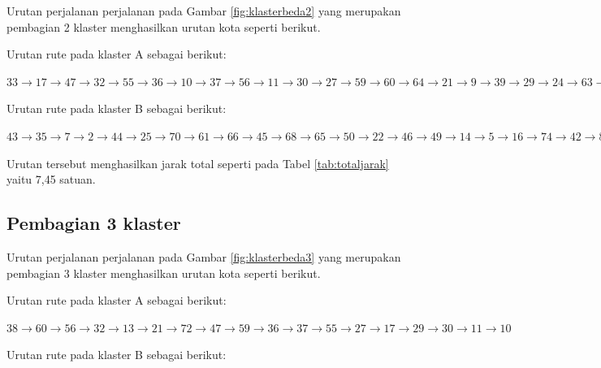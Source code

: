 Urutan perjalanan perjalanan pada Gambar \ref{fig:klasterbeda2} yang merupakan pembagian 2 klaster menghasilkan urutan kota seperti berikut.

\noindent Urutan rute pada klaster A sebagai berikut:

\noindent $
33 \rightarrow 17 \rightarrow 47 \rightarrow 32 \rightarrow 55 \rightarrow 36 \rightarrow 10 \rightarrow 37 \rightarrow 56 \rightarrow 11 \rightarrow 30 \rightarrow 27 \rightarrow 59 \rightarrow 60 \rightarrow 64 \rightarrow 21 \rightarrow 9 \rightarrow 39 \rightarrow 29 \rightarrow 24 \rightarrow 63 \rightarrow 72 \rightarrow 13 \rightarrow 6 \rightarrow 38 \rightarrow 52
$

\noindent Urutan rute pada klaster B sebagai berikut:

\noindent $
43 \rightarrow 35 \rightarrow 7 \rightarrow 2 \rightarrow 44 \rightarrow 25 \rightarrow 70 \rightarrow 61 \rightarrow 66 \rightarrow 45 \rightarrow 68 \rightarrow 65 \rightarrow 50 \rightarrow 22 \rightarrow 46 \rightarrow 49 \rightarrow 14 \rightarrow 5 \rightarrow 16 \rightarrow 74 \rightarrow 42 \rightarrow 8 \rightarrow 48 \rightarrow 31 \rightarrow 26 \rightarrow 18 \rightarrow 54 \rightarrow 40 \rightarrow 58 \rightarrow 67 \rightarrow 15 \rightarrow 12 \rightarrow 57 \rightarrow 20 \rightarrow 34 \rightarrow 69 \rightarrow 75 \rightarrow 41 \rightarrow 23 \rightarrow 51 \rightarrow 19 \rightarrow 28 \rightarrow 1 \rightarrow 62 \rightarrow 4 \rightarrow 53 \rightarrow 3 \rightarrow 71 \rightarrow 73
$

Urutan tersebut menghasilkan jarak total seperti pada Tabel \ref{tab:totaljarak} yaitu 7,45 satuan.

\subsection{Pembagian 3 klaster}

Urutan perjalanan perjalanan pada Gambar \ref{fig:klasterbeda3} yang merupakan pembagian 3 klaster menghasilkan urutan kota seperti berikut.

\noindent Urutan rute pada klaster A sebagai berikut:

\noindent $
38 \rightarrow 60 \rightarrow 56 \rightarrow 32 \rightarrow 13 \rightarrow 21 \rightarrow 72 \rightarrow 47 \rightarrow 59 \rightarrow 36 \rightarrow 37 \rightarrow 55 \rightarrow 27 \rightarrow 17 \rightarrow 29 \rightarrow 30 \rightarrow 11 \rightarrow 10
$ 

\noindent Urutan rute pada klaster B sebagai berikut:

